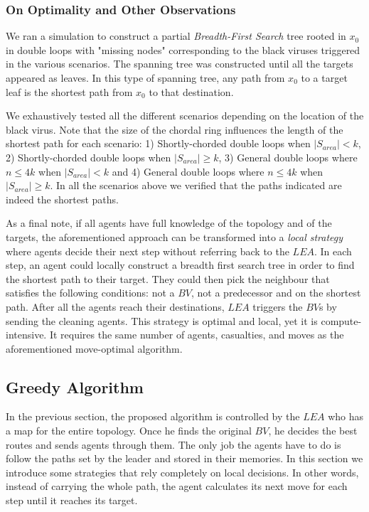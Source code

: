 \subsubsection{On Optimality and Other Observations}\label{local-opt}
 

 We ran a simulation to construct a partial  {\it Breadth-First Search} tree rooted in $x_0$ 
in double loops  with "missing nodes" corresponding to the black viruses triggered in the various scenarios. The spanning tree was constructed until all the targets appeared as leaves. In this type of spanning tree, any path from $x_0$ to a target leaf is the shortest path from $x_0$  to that destination.

We exhaustively tested all the different scenarios depending on the location of the black virus. Note that the size of the chordal ring influences the length of the shortest path for each scenario: 
 1) Shortly-chorded double loops when $|S_{area}|<k$, 2) Shortly-chorded double loops when $|S_{area}|\ge k$, 3) General double loops where $n\leq4k$ when $|S_{area}|<k$ and 4) General double loops where $n\leq4k$ when $|S_{area}|\ge k$.
In all the scenarios above we verified that the paths indicated are indeed the shortest paths.

\medbreak

As a final note,  if all agents have full knowledge of the topology and of the targets,   the aforementioned approach can be transformed into a {\em local strategy} where agents decide their next step without referring back to the $LEA$. In each step, an agent could locally construct a breadth first search tree in order to find the shortest path to their target. They could then pick the neighbour that satisfies the following conditions:  not a $BV$,  not a predecessor and on the shortest path.
After all the agents reach their destinations, $LEA$ triggers the $BV$s by sending the cleaning agents. This strategy is optimal and local, yet it is compute-intensive. It requires the same number of agents, casualties, and moves as the aforementioned move-optimal algorithm.



\subsection{Greedy Algorithm}
 
In the previous section, the proposed algorithm is controlled by the $LEA$ who has a map for the entire topology. Once he finds the original $BV$, he decides the best routes and sends agents through them. The only job the agents have to do is follow the paths set by the leader and stored in their memories. In this section we introduce some strategies that rely completely on local decisions. 
In other words, instead of carrying the whole path, the agent calculates its next move for each step until it reaches its target. 


